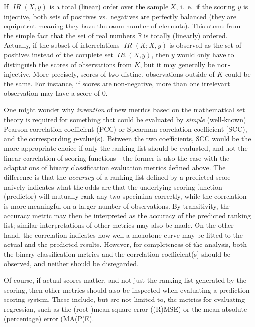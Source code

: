 \documentclass[conference, a4paper, 12pt]{IEEEtran}
\newcommand*{\reals}{\mathbb{R}}
\DeclareMathOperator{\interrel}{\mathit{IR}}
\begin{document}
    \par

    If $ \interrel \left( X , y \right) $ is a total (linear) order over the sample $ X $, i.~e.\ if the scoring $ y $ is injective, both sets of positives vs.\ negatives are perfectly balanced (they are equipotent meaning they have the same number of elements). This stems from the simple fact that the set of real numbers $ \reals $ is totally (linearly) ordered. Actually, if the subset of interrelations $ \interrel \left( K ; X , y \right) $ is observed as the set of positives instead of the complete set $ \interrel \left( X , y \right) $, then $ y $ would only have to distinguish the scores of observations from $ K $, but it may generally be non-injective. More precisely, scores of two distinct observations outside of $ K $ could be the same. For instance, if scores are non-negative, more than one irrelevant observation may have a score of $ 0 $.

    \par

    One might wonder why \emph{invention} of new metrics based on the mathematical set theory is required for something that could be evaluated by \emph{simple} (well-known) Pearson correlation coefficient (PCC) or Spearman correlation coefficient (SCC), and the corresponding $ p $-value(s). Between the two coefficients, SCC would be the more appropriate choice if only the ranking list should be evaluated, and not the linear correlation of scoring functions---the former is also the case with the adaptations of binary classification evaluation metrics defined above. The difference is that the \emph{accuracy} of a ranking list defined by a predicted score naively indicates what the odds are that the underlying scoring function (predictor) will mutually rank any two specimina correctly, while the correlation is more meaningful on a larger number of observations. By transitivity, the accuracy metric may then be interpreted as the accuracy of the predicted ranking list; similar interpretations of other metrics may also be made. On the other hand, the correlation indicates how well a monotone curve may be fitted to the actual and the predicted results. However, for completeness of the analysis, both the binary classification metrics and the correlation coefficient(s) should be observed, and neither should be disregarded.

    \par

    Of course, if actual scores matter, and not just the ranking list generated by the scoring, then other metrics should also be inspected when evaluating a prediction scoring system. These include, but are not limited to, the metrics for evaluating regression, such as the (root-)mean-square error ((R)MSE) or the mean absolute (percentage) error (MA(P)E).

    \par

    \printbibliography[heading = bibliography]
\end{document}
